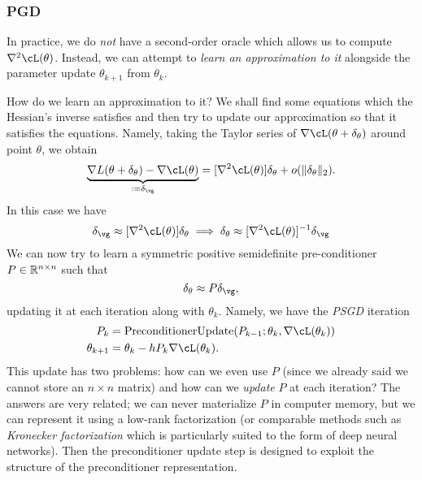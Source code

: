 \documentclass[../../book-main.tex]{subfiles}
\begin{document}
\subsubsection{PGD}

In practice, we do \textit{not} have a second-order oracle which allows us to compute \(\nabla^{2}\cL(\theta)\). Instead, we can attempt to \textit{learn an approximation to it} alongside the parameter update \(\theta_{k + 1}\) from \(\theta_{k}\). 

How do we learn an approximation to it? We shall find some equations which the Hessian's inverse satisfies and then try to update our approximation so that it satisfies the equations. Namely, taking the Taylor series of \(\nabla \cL(\theta + \delta_{\theta})\) around point \(\theta\), we obtain 
\begin{equation}
    \underbrace{\nabla L(\theta + \delta_{\theta}) - \nabla \cL(\theta)}_{:= \delta_{\vg}} = [\nabla^{2} \cL(\theta)]\delta_{\theta} + o(\norm{\delta_{\theta}}_{2}).
\end{equation}
In this case we have 
\begin{equation}
    \delta_{\vg} \approx [\nabla^{2}\cL(\theta)]\delta_{\theta} \implies \delta_{\theta} \approx [\nabla^{2}\cL(\theta)]^{-1}\delta_{\vg}
\end{equation}
We can now try to learn a symmetric positive semidefinite pre-conditioner \(P \in \mathbb{R}^{n \times n}\) such that 
\begin{equation}
    \delta_{\theta} \approx P\delta_{\vg},
\end{equation}
updating it at each iteration along with \(\theta_{k}\). Namely, we have the \textit{PSGD} iteration
\begin{align}
    P_{k}
    &= \mathrm{PreconditionerUpdate}(P_{k - 1}; \theta_{k}, \nabla \cL(\theta_{k})) \\ 
    \theta_{k + 1}
    &= \theta_{k} - hP_{k}\nabla \cL(\theta_{k}).
\end{align}
This update has two problems: how can we even use \(P\) (since we already said we cannot store an \(n \times n\) matrix) and how can we \textit{update} \(P\) at each iteration? The answers are very related; we can never materialize \(P\) in computer memory, but we can represent it using a low-rank factorization (or comparable methods such as \textit{Kronecker factorization} which is particularly suited to the form of deep neural networks). Then the preconditioner update step is designed to exploit the structure of the preconditioner representation.
\end{document}
